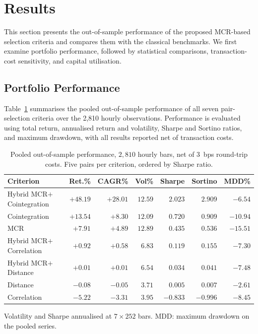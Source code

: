 \documentclass[11pt,a4paper]{article}
\theoremstyle{definition}
\newcommand{\MCR}{\ensuremath{\mathrm{MCR}}}
\begin{document}
\section{Results}
\label{sec:results}

This section presents the out-of-sample performance of the proposed MCR-based
selection criteria and compares them with the classical benchmarks. We first
examine portfolio performance, followed by statistical comparisons, transaction-cost
sensitivity, and capital utilisation.

\subsection{Portfolio Performance}


Table~\ref{tab:perf} summarises the pooled out-of-sample performance of all seven pair-selection
criteria over the 2,810 hourly observations. Performance is evaluated using total
return, annualised return and volatility, Sharpe and Sortino ratios, and maximum
drawdown, with all results reported net of transaction costs.

\begin{table}[H]
\centering
\caption{Pooled out-of-sample performance, $2{,}810$ hourly bars, net of $3$~bps
round-trip costs. Five pairs per criterion, ordered by Sharpe ratio.}
\label{tab:perf}
\small
\begin{tabular}{lrrrrrr}
\toprule
\textbf{Criterion} & \textbf{Ret.\%} & \textbf{CAGR\%} & \textbf{Vol\%}
  & \textbf{Sharpe} & \textbf{Sortino} & \textbf{MDD\%} \\
\midrule
Hybrid \MCR$+$Cointegration & $+48.19$ & $+28.01$ & $12.59$ & $2.023$ & $2.909$ & $-6.54$ \\
Cointegration               & $+13.54$ & $+8.30$  & $12.09$ & $0.720$ & $0.909$ & $-10.94$ \\
\MCR                        & $+7.91$  & $+4.89$  & $12.89$ & $0.435$ & $0.536$ & $-15.51$ \\
Hybrid \MCR$+$Correlation   & $+0.92$  & $+0.58$  & $6.83$  & $0.119$ & $0.155$ & $-7.30$ \\
Hybrid \MCR$+$Distance      & $+0.01$  & $+0.01$  & $6.54$  & $0.034$ & $0.041$ & $-7.48$ \\
Distance                    & $-0.08$  & $-0.05$  & $3.71$  & $0.005$ & $0.007$ & $-2.61$ \\
Correlation                 & $-5.22$  & $-3.31$  & $3.95$  & $-0.833$& $-0.996$& $-8.45$ \\
\bottomrule
\end{tabular}

\vspace{4pt}
{\footnotesize Volatility and Sharpe annualised at $7\times252$ bars.
MDD: maximum drawdown on the pooled series.}
\end{table}
\end{document}
